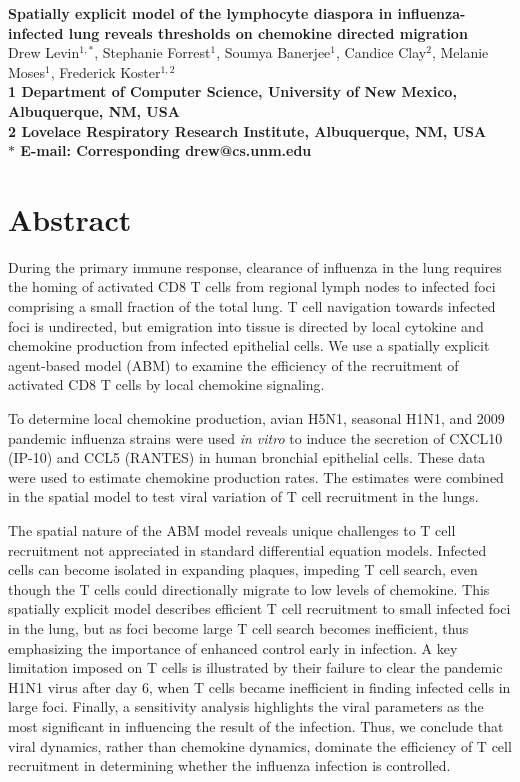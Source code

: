 \documentclass[10pt]{article}
\date{}
\begin{document}
\begin{flushleft}
{\Large
\textbf{Spatially explicit model of the lymphocyte diaspora in influenza-infected lung reveals thresholds on chemokine directed migration}
}
\\
Drew Levin$^{1,\ast}$, 
Stephanie Forrest$^{1}$, 
Soumya Banerjee$^{1}$,
Candice Clay$^{2}$, 
Melanie Moses$^{1}$, 
Frederick Koster$^{1,2}$
\\
\bf{1} Department of Computer Science, University of New Mexico, Albuquerque, NM, USA
\\
\bf{2} Lovelace Respiratory Research Institute, Albuquerque, NM, USA
\\
$\ast$ E-mail: Corresponding drew@cs.unm.edu
\end{flushleft}



\section*{Abstract}

During the primary immune response, clearance of influenza in the lung requires the homing of activated CD8 T cells from regional lymph nodes to infected foci comprising a small fraction of the total lung.  T cell navigation towards infected foci is undirected, but emigration into tissue is directed by local cytokine and chemokine production from infected epithelial cells.  We use a spatially explicit agent-based model (ABM) to examine the efficiency of the recruitment of activated CD8 T cells by local chemokine signaling. 

To determine local chemokine production, avian H5N1, seasonal H1N1, and 2009 pandemic influenza strains were used \textit{in vitro} to induce the secretion of CXCL10 (IP-10) and CCL5 (RANTES) in human bronchial epithelial cells.  These data were used to estimate chemokine production rates. The estimates were combined in the spatial model to test viral variation of T cell recruitment in the lungs.

The spatial nature of the ABM model reveals unique challenges to T cell recruitment not appreciated in standard differential equation models.  Infected cells can become isolated in expanding plaques, impeding T cell search, even though the T cells could directionally migrate to low levels of chemokine.  This spatially explicit model describes efficient T cell recruitment to small infected foci in the lung, but as foci become large T cell search becomes inefficient, thus emphasizing the importance of enhanced control early in infection.  A key limitation imposed on T cells is illustrated by their failure to clear the pandemic H1N1 virus after day 6, when T cells became inefficient in finding infected cells in large foci.  Finally, a sensitivity analysis highlights the viral parameters as the most significant in influencing the result of the infection.  Thus, we conclude that viral dynamics, rather than chemokine dynamics, dominate the efficiency of T cell recruitment in determining whether the influenza infection is controlled.
\end{document}

